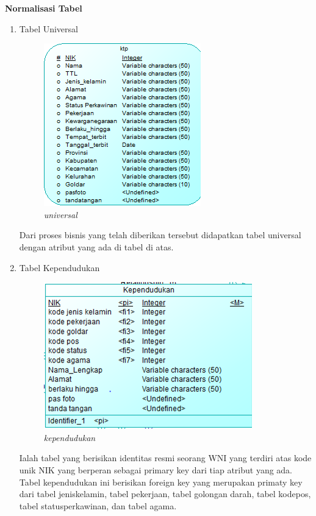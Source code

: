 \documentclass[12pt,a4paper,bahasa]{article}
\begin{document}
	\textbf{Normalisasi Tabel}
	\begin{enumerate}
	
	\item Tabel Universal\\
	
\begin{figure}[!htbp]
\centering
\includegraphics[scale=1.5]{gambar/universal.png}
\caption{\textit{universal}}
\label{univ}
\end{figure}	
	
	Dari proses bisnis yang telah diberikan tersebut didapatkan tabel universal dengan atribut yang ada di tabel di atas.
	
	\item Tabel Kependudukan\\
	
\begin{figure}[!htbp]
\centering
\includegraphics[scale=1.5]{gambar/kependudukan.png}
\caption{\textit{kependudukan}}
\label{kependudukan}
\end{figure}	
	
	Ialah tabel yang berisikan identitas resmi seorang WNI yang terdiri atas kode unik NIK yang berperan sebagai primary key dari tiap atribut yang ada. Tabel kependudukan ini berisikan foreign key yang merupakan primaty key dari tabel jeniskelamin, tabel pekerjaan, tabel golongan darah, tabel kodepos, tabel statusperkawinan, dan tabel agama.
	

\end{enumerate}
\end{document}
